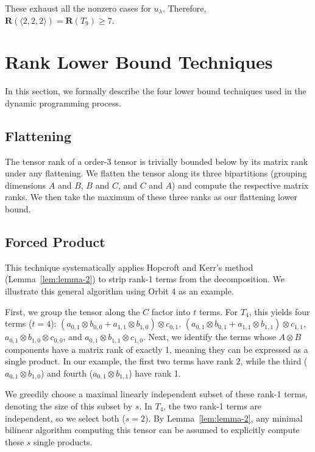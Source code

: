 \documentclass[11pt]{article}
\begin{document}
These exhaust all the nonzero cases for $u_\lambda$. Therefore, $\mathbf{R} (\langle 2,2,2 \rangle) = \mathbf{R} (T_9) \geq 7$.

\section{Rank Lower Bound Techniques}\label{sec:techniques}

In this section, we formally describe the four lower bound techniques used in the dynamic programming process.

\subsection{Flattening}
The tensor rank of a order-3 tensor is trivially bounded below by its matrix rank under any flattening. We flatten the tensor along its three bipartitions (grouping dimensions $A$ and $B$, $B$ and $C$, and $C$ and $A$) and compute the respective matrix ranks. We then take the maximum of these three ranks as our flattening lower bound.

\subsection{Forced Product}
This technique systematically applies Hopcroft and Kerr's method (Lemma~\ref{lem:lemma-2}) to strip rank-1 terms from the decomposition. We illustrate this general algorithm using Orbit 4 as an example.

First, we group the tensor along the $C$ factor into $t$ terms. For $T_4$, this yields four terms ($t=4$): $(a_{0,1} \otimes b_{0,0} + a_{1,1} \otimes b_{1,0}) \otimes c_{0,1}$, $(a_{0,1} \otimes b_{0,1} + a_{1,1} \otimes b_{1,1}) \otimes c_{1,1}$, $a_{0,1} \otimes b_{1,0} \otimes c_{0,0}$, and $a_{0,1} \otimes b_{1,1} \otimes c_{1,0}$. Next, we identify the terms whose $A \otimes B$ components have a matrix rank of exactly 1, meaning they can be expressed as a single product. In our example, the first two terms have rank 2, while the third ($a_{0,1} \otimes b_{1,0}$) and fourth ($a_{0,1} \otimes b_{1,1}$) have rank 1.

We greedily choose a maximal linearly independent subset of these rank-1 terms, denoting the size of this subset by $s$. In $T_4$, the two rank-1 terms are independent, so we select both ($s=2$). By Lemma~\ref{lem:lemma-2}, any minimal bilinear algorithm computing this tensor can be assumed to explicitly compute these $s$ single products.
\end{document}
